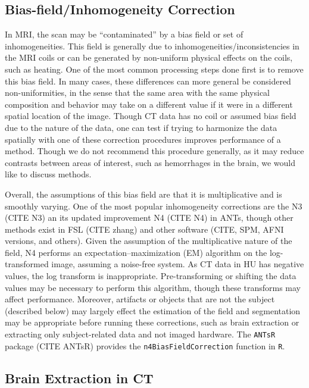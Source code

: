 \documentclass[]{elsarticle} %
\begin{document}
\hypertarget{bias-fieldinhomogeneity-correction}{%
\subsection{Bias-field/Inhomogeneity
Correction}\label{bias-fieldinhomogeneity-correction}}

In MRI, the scan may be ``contaminated'' by a bias field or set of
inhomogeneities. This field is generally due to
inhomogeneities/inconsistencies in the MRI coils or can be generated by
non-uniform physical effects on the coils, such as heating. One of the
most common processing steps done first is to remove this bias field. In
many cases, these differences can more general be considered
non-uniformities, in the sense that the same area with the same physical
composition and behavior may take on a different value if it were in a
different spatial location of the image. Though CT data has no coil or
assumed bias field due to the nature of the data, one can test if trying
to harmonize the data spatially with one of these correction procedures
improves performance of a method. Though we do not recommend this
procedure generally, as it may reduce contrasts between areas of
interest, such as hemorrhages in the brain, we would like to discuss
methods.

Overall, the assumptions of this bias field are that it is
multiplicative and is smoothly varying. One of the most popular
inhomogeneity corrections are the N3 (CITE N3) an its updated
improvement N4 (CITE N4) in ANTs, though other methods exist in FSL
(CITE zhang) and other software (CITE, SPM, AFNI versions, and others).
Given the assumption of the multiplicative nature of the field, N4
performs an expectation--maximization (EM) algorithm on the
log-transformed image, assuming a noise-free system. As CT data in HU
has negative values, the log transform is inappropriate.
Pre-transforming or shifting the data values may be necessary to perform
this algorithm, though these transforms may affect performance.
Moreover, artifacts or objects that are not the subject (described
below) may largely effect the estimation of the field and segmentation
may be appropriate before running these corrections, such as brain
extraction or extracting only subject-related data and not imaged
hardware. The \texttt{ANTsR} package (CITE ANTsR) provides the
\texttt{n4BiasFieldCorrection} function in \texttt{R}.

\hypertarget{brain-extraction-in-ct}{%
\subsection{Brain Extraction in CT}\label{brain-extraction-in-ct}}
\end{document}

